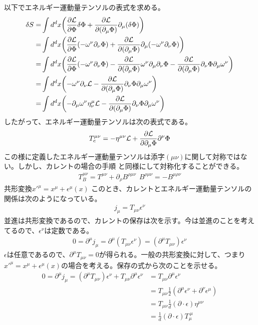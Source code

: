 \documentclass[11pt, dvipdfmx]{article}
\numberwithin{equation}{section}
\begin{document}
以下でエネルギー運動量テンソルの表式を求める。
\begin{align}
    \delta S=& \int d^dx \qty(\pdv{\mathcal{L}}{\Phi}\delta \Phi + \pdv{\mathcal{L}}{(\partial_\mu \Phi)}\partial_\mu(\delta \Phi))\notag\\
    =& \int d^dx \qty(\pdv{\mathcal{L}}{\Phi}\qty(-\omega^\nu \partial_\nu \Phi) + \pdv{\mathcal{L}}{(\partial_\mu \Phi)}\partial_\mu\qty(-\omega^\nu \partial_\nu \Phi))\notag\\
    =& \int d^dx \qty(\pdv{\mathcal{L}}{\Phi}\qty(-\omega^\nu \partial_\nu \Phi) - \pdv{\mathcal{L}}{(\partial_\mu \Phi)}\omega^\nu \partial_\mu\partial_\nu \Phi-\pdv{\mathcal{L}}{(\partial_\mu \Phi)}\partial_\nu \Phi\partial_\mu\omega^\nu )\notag\\
    =& \int d^dx \qty(-\omega^\nu \partial_\nu \mathcal{L}-\pdv{\mathcal{L}}{(\partial_\mu \Phi)}\partial_\nu \Phi\partial_\mu\omega^\nu )\notag\\
    =& \int d^dx \qty(-\partial_\mu \omega^\nu \eta^\mu_\nu \mathcal{L}-\pdv{\mathcal{L}}{(\partial_\mu \Phi)}\partial_\nu \Phi\partial_\mu\omega^\nu )
\end{align}
したがって、エネルギー運動量テンソルは次の表式である。
\begin{align}
    T_c^{\mu\nu}=-\eta^{\mu\nu}\mathcal{L}+\pdv{\mathcal{L}}{\partial_\mu \Phi}\partial^\nu \Phi\label{energy momentum tensor}
\end{align}
この様に定義したエネルギー運動量テンソルは添字$(\mu\nu)$に関して対称ではない。しかし、カレントの場合の手順
と同様にして対称化することができる。
\begin{align}
    T_B^{\mu\nu}=T^{\mu\nu}+\partial_\rho B^{\rho \mu\nu} \ \ B^{\rho\mu\nu}=-B^{\mu \rho \nu}
\end{align}
共形変換$x'^\mu =x^\mu +\epsilon^\mu (x)$
このとき、カレントとエネルギー運動量テンソルの関係は次のようになっている。
\begin{align}
    j_\mu=T_{\mu\nu}\epsilon^\nu\label{current and T}
\end{align}
並進は共形変換であるので、カレントの保存は次を示す。今は並進のことを考えてるので、$\epsilon^\nu$は定数である。
\begin{align}
    0=\partial^\mu j_\mu=\partial^\mu(T_{\mu\nu}\epsilon^\nu)=(\partial^\mu T_{\mu \nu})\epsilon^\nu
\end{align}
$\epsilon$は任意であるので、$\partial^\mu T_{\mu\nu}=0$が得られる。一般の共形変換に対して、つまり $x'^\mu=x^\mu +\epsilon^\mu(x)$の場合を考える。保存の式から次のことを示せる。
\begin{align}
    0=\partial^\mu j_\mu =(\partial^\mu T_{\mu\nu})\epsilon^\nu + T_{\mu\nu}\partial^\mu \epsilon^\nu
    &= T_{\mu\nu}\partial^\mu \epsilon^\nu\\
    &= T_{\mu\nu}\frac{1}{2}(\partial^\mu \epsilon^\nu + \partial^\nu \epsilon^\mu)\label{T symmetrized}\\
    &= T_{\mu\nu}\frac{1}{d}(\partial \cdot \epsilon)\eta^{\mu\nu}\label{T trace form}\\
    &= \frac{1}{d}(\partial \cdot \epsilon)T^{\ \mu}_\mu\label{T traceless}
\end{align}
\end{document}
